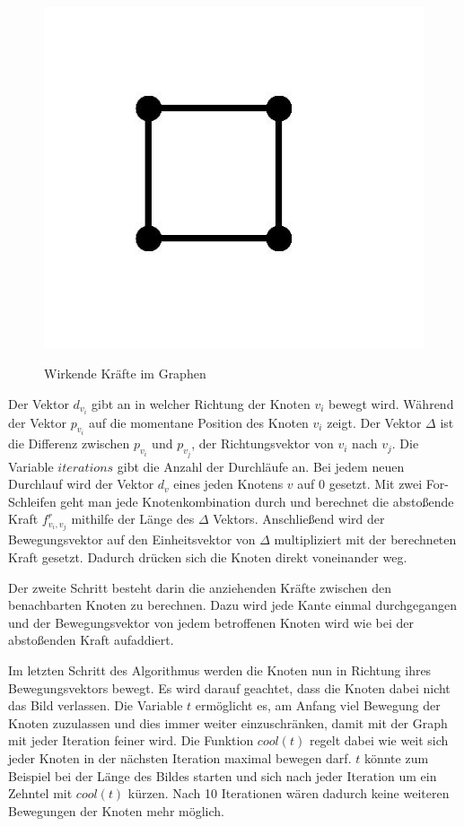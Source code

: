 \begin{figure}[t]
        	{\includegraphics[scale=0.3]{bilder/standardgraph}\label{fig_standardgraph}
        	}
        	\\
        	\caption[Wirkende Kräfte im Graphen]{Wirkende Kräfte im Graphen}
        	\label{fig_testbild2}
        \end{figure} 
        
         
Der Vektor $d_{v_{i}}$ gibt an in welcher Richtung der Knoten $v_{i}$ bewegt wird. Während der Vektor $p_{v_{i}}$ auf die momentane Position des Knoten $v_{i}$ zeigt. Der Vektor $\Delta$ ist die Differenz zwischen $p_{v_{i}}$ und $p_{v_{j}}$, der Richtungsvektor von $v_{i}$ nach $v_{j}$. Die Variable $iterations$ gibt die Anzahl der Durchläufe an. Bei jedem neuen Durchlauf wird der Vektor  $d_{v}$  eines jeden Knotens $v$ auf 0 gesetzt. Mit zwei For-Schleifen geht man jede Knotenkombination durch und berechnet die abstoßende Kraft $f^{r}_{v_{i},v_{j}}$ mithilfe der Länge des $\Delta$ Vektors. Anschließend wird der Bewegungsvektor auf den Einheitsvektor von $\Delta$ multipliziert mit der berechneten Kraft gesetzt. Dadurch drücken sich die Knoten direkt voneinander weg.

Der zweite Schritt besteht darin die anziehenden Kräfte zwischen den benachbarten Knoten zu berechnen. Dazu wird jede Kante einmal durchgegangen und der Bewegungsvektor von jedem betroffenen Knoten wird wie bei der abstoßenden Kraft aufaddiert. 

Im letzten Schritt des Algorithmus werden die Knoten nun in Richtung ihres Bewegungsvektors bewegt. Es wird darauf geachtet, dass die Knoten dabei nicht das Bild verlassen. Die Variable $t$ ermöglicht es, am Anfang viel Bewegung der Knoten zuzulassen und dies immer weiter einzuschränken, damit mit der Graph mit jeder Iteration feiner wird. Die Funktion $cool(t)$ regelt dabei wie weit sich jeder Knoten in der nächsten Iteration maximal bewegen darf. $t$ könnte zum Beispiel bei der Länge des Bildes starten und sich nach jeder Iteration um ein Zehntel mit $cool(t)$ kürzen. Nach 10 Iterationen wären dadurch keine weiteren Bewegungen der Knoten mehr möglich.

